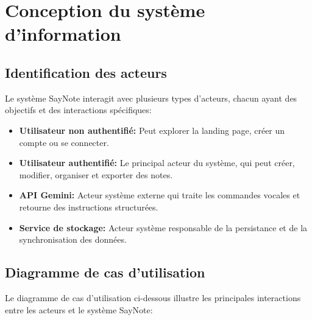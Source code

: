     \section{Conception du système d'information}
    
    \subsection{Identification des acteurs}
    
    Le système SayNote interagit avec plusieurs types d'acteurs, chacun ayant des objectifs et des interactions spécifiques:
    
    \begin{itemize}
        \item \textbf{Utilisateur non authentifié:} Peut explorer la landing page, créer un compte ou se connecter.
        
        \item \textbf{Utilisateur authentifié:} Le principal acteur du système, qui peut créer, modifier, organiser et exporter des notes.
        
        \item \textbf{API Gemini:} Acteur système externe qui traite les commandes vocales et retourne des instructions structurées.
        
        \item \textbf{Service de stockage:} Acteur système responsable de la persistance et de la synchronisation des données.
    \end{itemize}
    
    \subsection{Diagramme de cas d'utilisation}
    
    Le diagramme de cas d'utilisation ci-dessous illustre les principales interactions entre les acteurs et le système SayNote:
    
